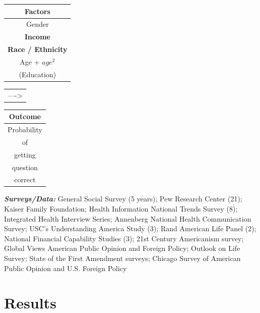 \documentclass[]{article}
\begin{document}
 \begin{table}[ht]
 \centering
     \begin{tabular}{c}  %
       \hline   %
       Factors          \\
       \hline   %
       Gender           \\
       \textbf{Income}           \\
       \textbf{Race / Ethnicity} \\
       Age + $age^2$    \\
       (Education)        \\
       \hline  %
     \end{tabular}
     \begin{tabular}{l}  %
       ---->
     \end{tabular}
     \begin{tabular}{c}  %
        \hline   %
        Outcome        \\
        \hline   %
        Probability      \\
        of     \\
        getting \\
        question     \\
        correct          \\
        \hline  %
      \end{tabular}
 \end{table}

\vspace{7mm}

 \emph{\textbf{Surveys/Data:}} \footnotesize{General Social Survey (5 years); Pew Research Center (21); Kaiser Family Foundation; Health Information National Trends Survey (8); Integrated Health Interview Series; Annenberg National Health Communication Survey; USC's Understanding America Study (3); Rand American Life Panel (2); National Financial Capability Studies (3); 21st Century Americanism survey; Global Views American Public Opinion and Foreign Policy; Outlook on Life Survey; State of the First Amendment surveys; Chicago Survey of American Public Opinion and U.S. Foreign Policy}

\newpage
\section{Results}\label{Results}
\end{document}
